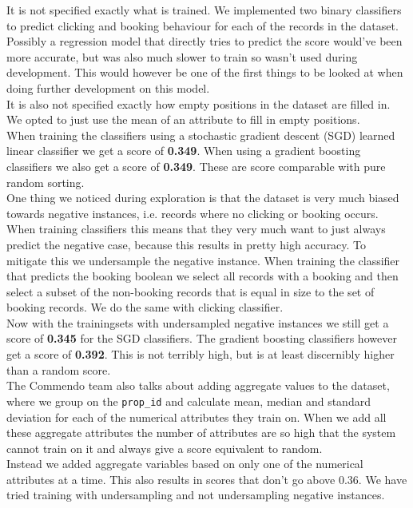 \documentclass{llncs}
\begin{document}
It is not specified exactly what is trained. We implemented two binary classifiers to predict clicking and booking behaviour for each of the records in the dataset. Possibly a regression model that directly tries to predict the score would've been more accurate, but was also much slower to train so wasn't used during development. This would however be one of the first things to be looked at when doing further development on this model.\\
It is also not specified exactly how empty positions in the dataset are filled in. We opted to just use the mean of an attribute to fill in empty positions.\\
When training the classifiers using a stochastic gradient descent (SGD) learned linear classifier we get a score of \textbf{0.349}. When using a gradient boosting classifiers we also get a score of \textbf{0.349}. These are score comparable with pure random sorting. \\
One thing we noticed during exploration is that the dataset is very much biased towards negative instances, i.e. records where no clicking or booking occurs. When training classifiers this means that they very much want to just always predict the negative case, because this results in pretty high accuracy. To mitigate this we undersample the negative instance. When training the classifier that predicts the booking boolean we select all records with a booking and then select a subset of the non-booking records that is equal in size to the set of booking records. We do the same with clicking classifier.\\
Now with the trainingsets with undersampled negative instances we still get a score of \textbf{0.345} for the SGD classifiers. The gradient boosting classifiers however get a score of \textbf{0.392}. This is not terribly high, but is at least discernibly higher than a random score.\\
The Commendo team also talks about adding aggregate values to the dataset, where we group on the \verb!prop_id! and  calculate mean, median and standard deviation for each of the numerical attributes they train on. When we add all these aggregate attributes the number of attributes are so high that the system cannot train on it and always give a score equivalent to random.\\
Instead we added aggregate variables based on only one of the numerical attributes at a time. This also results in scores that don't go above 0.36. We have tried training with undersampling and not undersampling negative instances.


\end{document}
